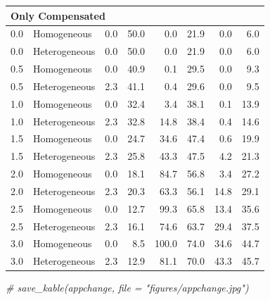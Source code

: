 \documentclass[
]{article}
\newenvironment{Shaded}{\begin{snugshade}}{\end{snugshade}}
\newcommand{\CommentTok}[1]{\textcolor[rgb]{0.56,0.35,0.01}{\textit{#1}}}
\begin{document}
\begin{table}[H]
\begin{tabular}{r|l|r|r|r|r|r|r}
\hline
\multicolumn{8}{l}{\textbf{Only Compensated}}\\
\hline
\hspace{1em}0.0 & Homogeneous & 0.0 & 50.0 & 0.0 & 21.9 & 0.0 & 6.0\\
\hline
\hspace{1em}0.0 & Heterogeneous & 0.0 & 50.0 & 0.0 & 21.9 & 0.0 & 6.0\\
\hline
\hspace{1em}0.5 & Homogeneous & 0.0 & 40.9 & 0.1 & 29.5 & 0.0 & 9.3\\
\hline
\hspace{1em}0.5 & Heterogeneous & 2.3 & 41.1 & 0.4 & 29.6 & 0.0 & 9.5\\
\hline
\hspace{1em}1.0 & Homogeneous & 0.0 & 32.4 & 3.4 & 38.1 & 0.1 & 13.9\\
\hline
\hspace{1em}1.0 & Heterogeneous & 2.3 & 32.8 & 14.8 & 38.4 & 0.4 & 14.6\\
\hline
\hspace{1em}1.5 & Homogeneous & 0.0 & 24.7 & 34.6 & 47.4 & 0.6 & 19.9\\
\hline
\hspace{1em}1.5 & Heterogeneous & 2.3 & 25.8 & 43.3 & 47.5 & 4.2 & 21.3\\
\hline
\hspace{1em}2.0 & Homogeneous & 0.0 & 18.1 & 84.7 & 56.8 & 3.4 & 27.2\\
\hline
\hspace{1em}2.0 & Heterogeneous & 2.3 & 20.3 & 63.3 & 56.1 & 14.8 & 29.1\\
\hline
\hspace{1em}2.5 & Homogeneous & 0.0 & 12.7 & 99.3 & 65.8 & 13.4 & 35.6\\
\hline
\hspace{1em}2.5 & Heterogeneous & 2.3 & 16.1 & 74.6 & 63.7 & 29.4 & 37.5\\
\hline
\hspace{1em}3.0 & Homogeneous & 0.0 & 8.5 & 100.0 & 74.0 & 34.6 & 44.7\\
\hline
\hspace{1em}3.0 & Heterogeneous & 2.3 & 12.9 & 81.1 & 70.0 & 43.3 & 45.7\\
\hline
\end{tabular}
\end{table}

\begin{Shaded}
\begin{Highlighting}[]
\CommentTok{\# save\_kable(appchange, file = "figures/appchange.jpg")}
\end{Highlighting}
\end{Shaded}
\end{document}
